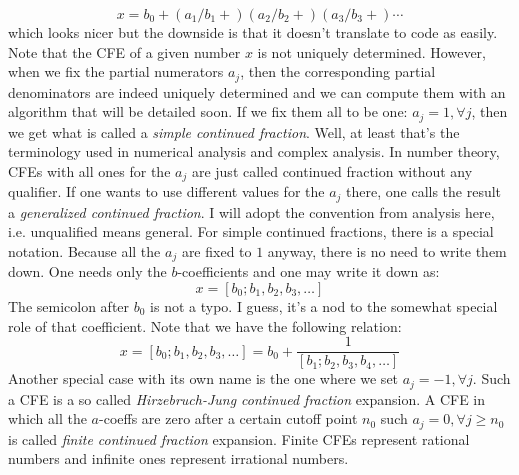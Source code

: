 \begin{equation}
x = b_0 + (a_1/b_1+) (a_2/b_2+) (a_3/b_3+) \cdots
\end{equation}
which looks nicer but the downside is that it doesn't translate to code as easily. Note that the CFE of a given number $x$ is not uniquely determined. However, when we fix the partial numerators $a_j$, then the corresponding partial denominators are indeed uniquely determined and we can compute them with an algorithm that will be detailed soon. If we fix them all to be one: $a_j = 1, \forall j$, then we get what is called a \emph{simple continued fraction}. Well, at least that's the terminology used in numerical analysis and complex analysis. In number theory, CFEs with all ones for the $a_j$ are just called continued fraction without any qualifier. If one wants to use different values for the $a_j$ there, one calls the result a \emph{generalized continued fraction}. I will adopt the convention from analysis here, i.e. unqualified means general. For simple continued fractions, there is a special notation. Because all the $a_j$ are fixed to $1$ anyway, there is no need to write them down. One needs only the $b$-coefficients and one may write it down as:
\begin{equation}
x = [b_0; b_1, b_2, b_3, \ldots]
\end{equation}
The semicolon after $b_0$ is not a typo. I guess, it's a nod to the somewhat special role of that coefficient. Note that we have the following relation:
\begin{equation}
x = [b_0; b_1, b_2, b_3, \ldots] = b_0 + \frac{1}{[b_1; b_2, b_3, b_4, \ldots]}
\end{equation}
Another special case with its own name is the one where we set  $a_j = -1, \forall j$. Such a CFE is a so called \emph{Hirzebruch-Jung continued fraction} expansion. A CFE in which all the $a$-coeffs are zero after a certain cutoff point $n_0$ such $a_j = 0, \forall j \geq n_0$ is called \emph{finite continued fraction} expansion. Finite CFEs represent rational numbers and infinite ones represent irrational numbers.



